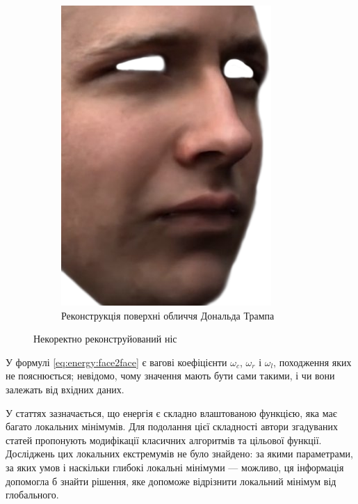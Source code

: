 \begin{figure}[h]
\begin{subfigure}[b]{0.4\textwidth}
  \end{subfigure}
  \begin{subfigure}[b]{0.4\textwidth}
    \centering
    \includegraphics[width=\textwidth]{images/trump-reconstructed}
    \caption{Реконструкція поверхні обличчя Дональда Трампа}
  \end{subfigure}
  \caption{Некоректно реконструйований ніс}
  \label{fig:questions:trump}
\end{figure}

У формулі \eqref{eq:energy:face2face} є
вагові коефіцієнти $\omega_c$, $\omega_r$ і $\omega_l$,
походження яких не пояснюється;
невідомо, чому значення мають бути сами такими,
і чи вони залежать від вхідних даних.

У статтях зазначається,
що енергія є складно влаштованою функцією,
яка має багато локальних мінімумів.
Для подолання цієї складності
автори згадуваних статей пропонують
модифікації класичних алгоритмів
та цільової функції.
Досліджень цих локальних екстремумів не було знайдено:
за якими параметрами, за яких умов і наскільки глибокі локальні мінімуми ---
можливо, ця інформація допомогла б знайти рішення,
яке допоможе відрізнити локальний мінімум від глобального.
